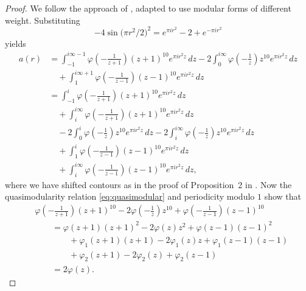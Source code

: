 \documentclass{aomart}
\theoremstyle{plain}
\numberwithin{theorem}{section}
\numberwithin{equation}{section}
\begin{document}
\begin{proof}
We follow the approach of \cite{V}, adapted to use modular forms of
different weight. Substituting
\[
-4\sin\mathopen{}\big(\pi r^2/2\big)^2\mathclose{} = e^{\pi i r^2} - 2 + e^{-\pi i r^2}
\]
yields
\begin{align*}
a(r) &= \int_{-1}^{i \infty -1} \varphi\mathopen{}\left(-\frac{1}{z+1}\right)\mathclose{} (z+1)^{10} e^{\pi i r^2 z} \, dz
- 2 \int_0^{i \infty} \varphi\mathopen{}\left(-\frac{1}{z}\right)\mathclose{} z^{10} e^{\pi i r^2 z} \, dz\\
& \quad \phantom{} + \int_1^{i \infty+1} \varphi\mathopen{}\left(-\frac{1}{z-1}\right)\mathclose{} (z-1)^{10} e^{\pi i r^2 z} \, dz\\
&=\int_{-1}^{i} \varphi\mathopen{}\left(-\frac{1}{z+1}\right)\mathclose{} (z+1)^{10} e^{\pi i r^2 z} \, dz\\
&\quad \phantom{} + \int_{i}^{i \infty} \varphi\mathopen{}\left(-\frac{1}{z+1}\right)\mathclose{} (z+1)^{10} e^{\pi i r^2 z} \, dz\\
& \quad \phantom{} - 2 \int_0^{i} \varphi\mathopen{}\left(-\frac{1}{z}\right)\mathclose{} z^{10} e^{\pi i r^2 z} \, dz - 2 \int_i^{i \infty} \varphi\mathopen{}\left(-\frac{1}{z}\right)\mathclose{} z^{10} e^{\pi i r^2 z} \, dz\\
& \quad \phantom{} + \int_1^{i} \varphi\mathopen{}\left(-\frac{1}{z-1}\right)\mathclose{} (z-1)^{10} e^{\pi i r^2 z} \, dz\\
&\quad \phantom{}  + \int_i^{i \infty} \varphi\mathopen{}\left(-\frac{1}{z-1}\right)\mathclose{} (z-1)^{10} e^{\pi i r^2 z} \, dz,
\end{align*}
where we have shifted contours as in the proof of Proposition~2 in \cite{V}.
Now the quasimodularity relation \eqref{eq:quasimodular} and periodicity
modulo $1$ show that
\begin{align*}
&\varphi\mathopen{}\left(-\frac{1}{z+1}\right)\mathclose{} (z+1)^{10} - 2  \varphi\mathopen{}\left(-\frac{1}{z}\right)\mathclose{} z^{10} + \varphi\mathopen{}\left(-\frac{1}{z-1}\right)\mathclose{} (z-1)^{10}
\\
& \qquad = \varphi(z+1) (z+1)^2 - 2 \varphi(z) z^2 + \varphi(z-1) (z-1)^2\\
& \qquad\qquad \phantom{} + \varphi_1(z+1) (z+1) - 2 \varphi_1(z) z + \varphi_1(z-1) (z-1)\\
& \qquad\qquad \phantom{} + \varphi_2(z+1) - 2 \varphi_2(z) + \varphi_2(z-1)\\
& \qquad = 2 \varphi(z).
\end{align*}

\end{proof}
\end{document}
